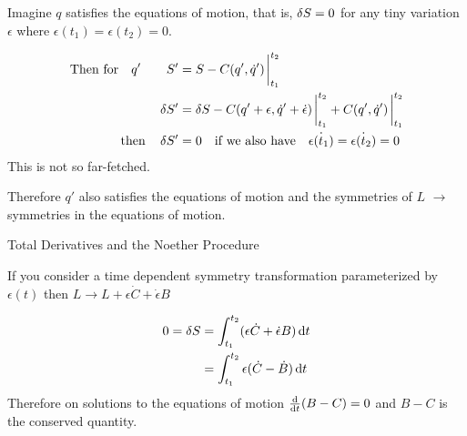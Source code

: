 \documentclass{article}
\begin{document}
Imagine $q$ satisfies the equations of motion, that is, $\var{S}=0$ for any tiny variation $\epsilon$ where $\epsilon(t_1)=\epsilon(t_2)=0$.



\begin{align*}
    \qq*{Then for}q'\qquad S' & =S-C(q',\dot{q}')\eval_{t_1}^{t_2}                                                               \\
    \var{S'}                  & =\var{S}-C(q'+\epsilon,\dot{q}'+\dot{\epsilon})\eval_{t_1}^{t_2}+C(q',\dot{q}')\eval_{t_1}^{t_2} \\
    \qthen* \var{S'}          & =0\qq{if we also have}\dot{\epsilon(t_1)}=\dot{\epsilon(t_2)}=0
\end{align*}
This is not so far-fetched.



Therefore $q'$ also satisfies the equations of motion and the symmetries of $L$ $\to$ symmetries in the equations of motion.


Total Derivatives and the Noether Procedure

If you consider a time dependent symmetry transformation parameterized by $\epsilon(t)$ then $L\to L+\epsilon\dot{C}+\dot{\epsilon}B$

\begin{align*}
    0=\var{S} & =\int_{t_1}^{t_2}(\epsilon\dot{C}+\dot{\epsilon}B)\dd{t} \\
              & =\int_{t_1}^{t_2}\epsilon(\dot{C}-\dot{B})\dd{t}
\end{align*}
Therefore on solutions to the equations of motion $\dv{t}(B-C)=0$ and $B-C$ is the conserved quantity.
\end{document}
